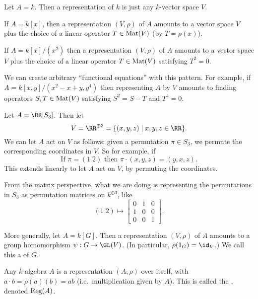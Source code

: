 \begin{example}
	\listhack
	\begin{enumerate}[(a)]
		\ii Let $A = k$.
		Then a representation of $k$ is just any $k$-vector space $V$.

		\ii If $A = k[x]$,
		then a representation $(V, \rho)$ of $A$
		amounts to a vector space $V$ plus the choice of
		a linear operator $T \in \mathrm{Mat}(V)$ (by $T = \rho(x)$).

		\ii If $A = k[x] / (x^2)$
		then a representation $(V, \rho)$ of $A$
		amounts to a vector space $V$ plus the choice of
		a linear operator $T \in \mathrm{Mat}(V)$ satisfying $T^2 = 0$.

		\ii We can create arbitrary ``functional equations'' with this pattern.
		For example, if $A = k[x,y] / (x^2 - x+y, y^4)$
		then representing $A$ by $V$ amounts to finding operators
		$S, T \in \mathrm{Mat}(V)$ satisfying $S^2 = S-T$ and $T^4 = 0$.
	\end{enumerate}
\end{example}

\begin{example}
	\listhack
	\begin{enumerate}[(a)]
		\ii Let $A = \RR[S_3]$.
		Then let 
		\[ V = \RR^{\oplus 3} = \{ (x,y,z) \mid x,y,z \in \RR \}. \]
		We can let $A$ act on $V$ as follows:
		given a permutation $\pi \in S_3$, we permute the corresponding
		coordinates in $V$.
		So for example, if 
		\[ \text{If } \pi = (1 \; 2)
		\text{ then } \pi \cdot (x,y,z) = (y,x,z). \]
		This extends linearly to let $A$ act on $V$,
		by permuting the coordinates.

		From the matrix perspective, what we are doing
		is representing the permutations in $S_3$
		as permutation matrices on $k^{\oplus 3}$, like
		\[ (1 \; 2)
		\mapsto \begin{bmatrix} 0&1&0 \\ 1&0&0 \\ 0&0&1 \end{bmatrix}. \]
		
		\ii More generally, let $A = k[G]$.
		Then a representation $(V, \rho)$ of $A$
		amounts to a group homomorphism $\psi : G \to \GL(V)$.
		(In particular, $\rho(1_G) = \id_V$.)
		We call this a  of $G$.
	\end{enumerate}
\end{example}
\begin{example}
	Any $k$-algebra $A$ is a representation $(A, \rho)$ over itself,
	with $a \cdot b = \rho(a)(b) = ab$ (i.e.\ multiplication given by $A$).
	This is called the , denoted $\operatorname{Reg}(A)$.
\end{example}

